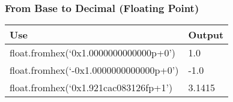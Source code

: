 \documentclass{beamer}
\begin{document}
\begin{frame}
  \frametitle{From Base to Decimal (Floating Point)}

  \begin{table}
    \begin{tabular}{l | l}
    Use          & Output   \\
    \hline
    float.fromhex(`0x1.0000000000000p+0')    &  1.0    \\
    float.fromhex(`-0x1.0000000000000p+0')   & -1.0    \\
    float.fromhex(`0x1.921cac083126fp+1')    &  3.1415 \\
    \end{tabular}
  \end{table}
\end{frame}
\end{document}
